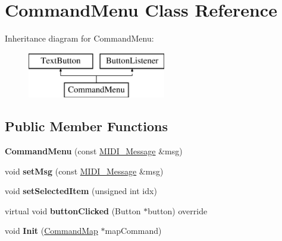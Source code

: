 \hypertarget{class_command_menu}{}\section{Command\+Menu Class Reference}
\label{class_command_menu}
Inheritance diagram for Command\+Menu\+:\begin{figure}[H]
\begin{center}
\leavevmode
\includegraphics[height=2.000000cm]{class_command_menu}
\end{center}
\end{figure}
\subsection*{Public Member Functions}
\begin{DoxyCompactItemize}
\item 
{\bfseries Command\+Menu} (const \hyperlink{struct_m_i_d_i___message}{M\+I\+D\+I\+\_\+\+Message} \&msg)\hypertarget{class_command_menu_a927cb9d3c584384039ac60f0aa12c250}{}\label{class_command_menu_a927cb9d3c584384039ac60f0aa12c250}

\item 
void {\bfseries set\+Msg} (const \hyperlink{struct_m_i_d_i___message}{M\+I\+D\+I\+\_\+\+Message} \&msg)\hypertarget{class_command_menu_abe597cac4bdbd0247b823d0b1d540838}{}\label{class_command_menu_abe597cac4bdbd0247b823d0b1d540838}

\item 
void {\bfseries set\+Selected\+Item} (unsigned int idx)\hypertarget{class_command_menu_aca42c2d962a51a0ab0d4450492aa44a9}{}\label{class_command_menu_aca42c2d962a51a0ab0d4450492aa44a9}

\item 
virtual void {\bfseries button\+Clicked} (Button $\ast$button) override\hypertarget{class_command_menu_a1e345fe4c3a136cb5500b4d17b63e6c7}{}\label{class_command_menu_a1e345fe4c3a136cb5500b4d17b63e6c7}

\item 
void {\bfseries Init} (\hyperlink{class_command_map}{Command\+Map} $\ast$map\+Command)\hypertarget{class_command_menu_a1c117115a7117d14bda09ecc7511c33b}{}\label{class_command_menu_a1c117115a7117d14bda09ecc7511c33b}

\end{DoxyCompactItemize}


